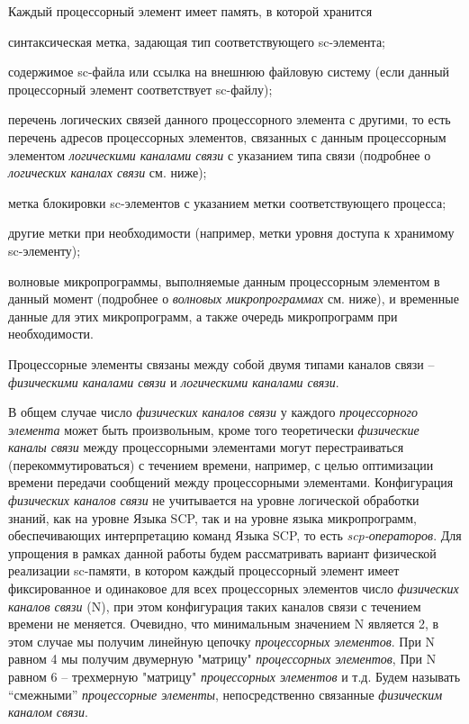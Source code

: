 \begin{textitemize}
	\item Каждый процессорный элемент имеет память, в которой хранится
	\begin{textitemize}
		\item синтаксическая метка, задающая тип соответствующего sc-элемента;
		\item содержимое sc-файла или ссылка на внешнюю файловую систему (если данный процессорный элемент соответствует sc-файлу);
		\item перечень логических связей данного процессорного элемента с другими, то есть перечень адресов процессорных элементов, связанных с данным процессорным элементом \textit{логическими каналами связи} с указанием типа связи (подробнее о \textit{логических каналах связи} см. ниже);
		\item метка блокировки sc-элементов с указанием метки соответствующего процесса;
		\item другие метки при необходимости (например, метки уровня доступа к хранимому sc-элементу);
		\item волновые микропрограммы, выполняемые данным процессорным элементом в данный момент (подробнее о \textit{волновых микропрограммах} см. ниже), и временные данные для этих микропрограмм, а также очередь микропрограмм при необходимости.
	\end{textitemize}
	\item Процессорные элементы связаны между собой двумя типами каналов связи -- \textit{физическими каналами связи} и \textit{логическими каналами связи}. 
	\begin{textitemize}
		\item В общем случае число \textit{физических каналов связи} у каждого \textit{процессорного элемента} может быть произвольным, кроме того теоретически \textit{физические каналы связи} между процессорными элементами могут перестраиваться (перекоммутироваться) с течением времени, например, с целью оптимизации времени передачи сообщений между процессорными элементами. Конфигурация \textit{физических каналов связи} не учитывается на уровне логической обработки знаний, как на уровне Языка SCP, так и на уровне языка микропрограмм, обеспечивающих интерпретацию команд Языка SCP, то есть \textit{scp-операторов}. Для упрощения в рамках данной работы будем рассматривать вариант физической реализации sc-памяти, в котором каждый процессорный элемент имеет фиксированное и одинаковое для всех процессорных элементов число \textit{физических каналов связи} (N), при этом конфигурация таких каналов связи с течением времени не меняется. Очевидно, что минимальным значением N является 2, в этом случае мы получим линейную цепочку \textit{процессорных элементов}. При N равном 4 мы получим двумерную "матрицу"{} \textit{процессорных элементов}, При N равном 6 -- трехмерную "матрицу"{} \textit{процессорных элементов} и т.д. Будем называть ``смежными'' \textit{процессорные элементы}, непосредственно связанные \textit{физическим каналом связи}.

\end{textitemize}
\end{textitemize}
